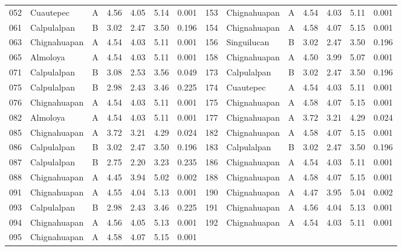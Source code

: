\documentclass[conference,letterpaper]{IEEEtran}
\begin{document}
\begin{table}[!t]
\begin{tabular}{@{}llcrrrr@{\hspace{1.6em}}llcrrrr@{}}
052 & Cuautepec & A & 4.56 & 4.05 & 5.14 & 0.001 & 153 & Chignahuapan & A & 4.54 & 4.03 & 5.11 & 0.001 \\
061 & Calpulalpan & B & 3.02 & 2.47 & 3.50 & 0.196 & 154 & Chignahuapan & A & 4.58 & 4.07 & 5.15 & 0.001 \\
063 & Chignahuapan & A & 4.54 & 4.03 & 5.11 & 0.001 & 156 & Singuilucan & B & 3.02 & 2.47 & 3.50 & 0.196 \\
065 & Almoloya & A & 4.54 & 4.03 & 5.11 & 0.001 & 158 & Chignahuapan & A & 4.50 & 3.99 & 5.07 & 0.001 \\
071 & Calpulalpan & B & 3.08 & 2.53 & 3.56 & 0.049 & 173 & Calpulalpan & B & 3.02 & 2.47 & 3.50 & 0.196 \\
075 & Calpulalpan & B & 2.98 & 2.43 & 3.46 & 0.225 & 174 & Cuautepec & A & 4.54 & 4.03 & 5.11 & 0.001 \\
076 & Chignahuapan & A & 4.54 & 4.03 & 5.11 & 0.001 & 175 & Chignahuapan & A & 4.58 & 4.07 & 5.15 & 0.001 \\
082 & Almoloya & A & 4.54 & 4.03 & 5.11 & 0.001 & 177 & Chignahuapan & A & 3.72 & 3.21 & 4.29 & 0.024 \\
085 & Chignahuapan & A & 3.72 & 3.21 & 4.29 & 0.024 & 182 & Chignahuapan & A & 4.58 & 4.07 & 5.15 & 0.001 \\
086 & Calpulalpan & B & 3.02 & 2.47 & 3.50 & 0.196 & 183 & Calpulalpan & B & 3.02 & 2.47 & 3.50 & 0.196 \\
087 & Calpulalpan & B & 2.75 & 2.20 & 3.23 & 0.235 & 186 & Chignahuapan & A & 4.54 & 4.03 & 5.11 & 0.001 \\
088 & Chignahuapan & A & 4.45 & 3.94 & 5.02 & 0.002 & 188 & Chignahuapan & A & 4.58 & 4.07 & 5.15 & 0.001 \\
091 & Chignahuapan & A & 4.55 & 4.04 & 5.13 & 0.001 & 190 & Chignahuapan & A & 4.47 & 3.95 & 5.04 & 0.002 \\
093 & Calpulalpan & B & 2.98 & 2.43 & 3.46 & 0.225 & 191 & Chignahuapan & A & 4.56 & 4.04 & 5.13 & 0.001 \\
094 & Chignahuapan & A & 4.56 & 4.05 & 5.13 & 0.001 & 192 & Chignahuapan & A & 4.54 & 4.03 & 5.11 & 0.001 \\
095 & Chignahuapan & A & 4.58 & 4.07 & 5.15 & 0.001 & \multicolumn{7}{c}{} \\
\bottomrule
\end{tabular}
\end{table}



\end{document}
